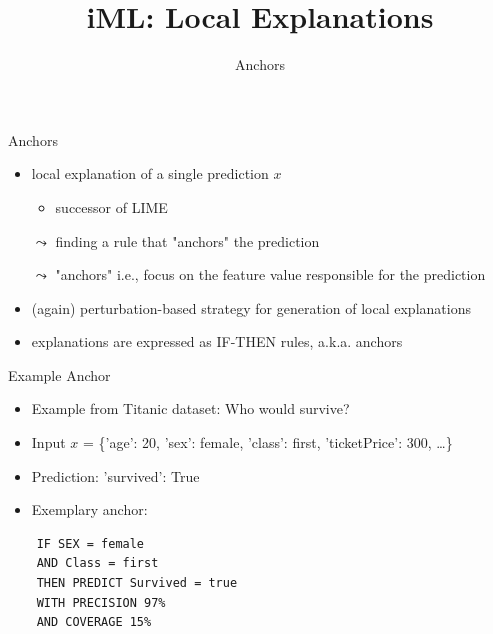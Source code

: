 \documentclass[aspectratio=169]{../latex_main/tntbeamer}  %
\title[Introduction]{iML: Local Explanations}
\subtitle{Anchors}
\begin{document}
	
	\maketitle



\begin{frame}{Anchors }
\begin{itemize}
		\item local explanation of a single prediction $x$
		\begin{itemize}
		    \item successor of LIME
		\end{itemize}
		\pause
		\item[$\leadsto$] finding a rule that "anchors" the prediction
		\item[$\leadsto$] "anchors" i.e., focus on the feature value responsible for the prediction
		\pause
		\smallskip
		\item (again) perturbation-based strategy for generation of local explanations
		\pause
		\smallskip
		\item explanations are expressed as IF-THEN rules, a.k.a. anchors
\end{itemize}
\end{frame}


\begin{frame}[fragile]{Example Anchor}
\begin{itemize}
        \item Example from Titanic dataset: Who would survive?
		\item Input $x$ = \{'age': 20, 'sex': female, 'class': first, 'ticketPrice': 300, \ldots\}
		\item Prediction: 'survived': True
		\item Exemplary anchor:
\end{itemize}

\begin{verbatim}
    IF SEX = female
    AND Class = first
    THEN PREDICT Survived = true
    WITH PRECISION 97%
    AND COVERAGE 15%
\end{verbatim}

\end{frame}
\end{document}
